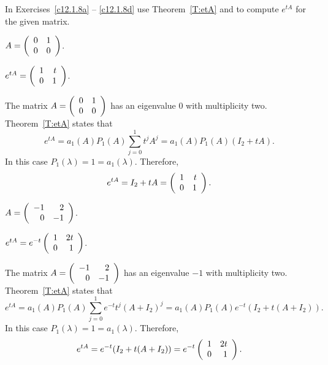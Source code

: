\documentclass{ximera}
\begin{document}
\noindent  In Exercises~\ref{c12.1.8a} -- \ref{c12.1.8d} use
Theorem~\ref{T:etA} and \Matlab to compute $e^{tA}$ for the given matrix.
\begin{computerExercise} \label{c12.1.8a}
$A = \left(\begin{array}{rr} 0 & 1\\ 0 &0\end{array}\right)$.

\begin{solution}
\ans $e^{tA} = \left(\begin{array}{rr} 1 & t\\ 0 &1\end{array}\right)$.

\soln The matrix $A = \left(\begin{array}{rr} 0 & 1\\ 0 &0\end{array}\right)$ has an eigenvalue $0$ with
multiplicity two.  Theorem~\ref{T:etA} states that 
\[
e^{tA} = a_1(A)P_1(A)\sum_{j=0}^1t^jA^j= a_1(A)P_1(A)(I_2+tA).
\]
In this case $P_1(\lambda)=1=a_1(\lambda)$.   Therefore,
\[
e^{tA} = I_2+tA = \left(\begin{array}{rr} 1 & t\\ 0 &1\end{array}\right).
\]


\end{solution}
\end{computerExercise}
\begin{computerExercise} \label{c12.1.8b}
$A = \left(\begin{array}{rr} -1 & 2\\ 0 &-1\end{array}\right)$.

\begin{solution}
\ans $e^{tA} = e^{-t}\left(\begin{array}{rr} 1 & 2t\\ 0 &1\end{array}\right)$.

\soln The matrix $A = \left(\begin{array}{rr} -1 & 2\\ 0 &-1\end{array}\right)$ has an eigenvalue $-1$ with
multiplicity two.  Theorem~\ref{T:etA} states that 
\[
e^{tA} = a_1(A)P_1(A)\sum_{j=0}^1e^{-t}t^j(A+I_2)^j=
a_1(A)P_1(A)e^{-t}(I_2+t(A+I_2)).
\]
In this case $P_1(\lambda)=1=a_1(\lambda)$.   Therefore,
\[
e^{tA} = e^{-t}(I_2+t(A+I_2)) = e^{-t}\left(\begin{array}{rr} 1 & 2t\\ 0 &1\end{array}\right).
\]


\end{solution}
\end{computerExercise}
\end{document}
